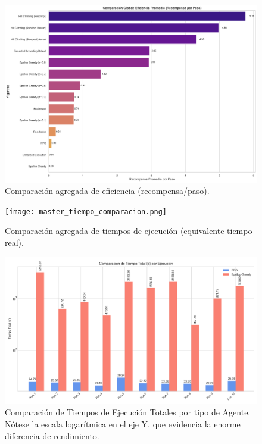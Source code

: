 \documentclass[12pt, oneside, openany]{book}
\begin{document}
\begin{figure}[H]
    \centering
    \includegraphics[width=1\textwidth]{master_eficiencia_comparacion.png}
    \caption{Comparación agregada de eficiencia (recompensa/paso).}
    \label{fig:master_eficiencia}
\end{figure}

\begin{figure}[H]
    \centering
    \texttt{[image: master\_tiempo\_comparacion.png]}
    \caption{Comparación agregada de tiempos de ejecución (equivalente tiempo real).}
    \label{fig:master_tiempo}
\end{figure}

\begin{figure}[H]
    \centering
    \includegraphics[width=1\textwidth]{tiempo_comparacion.png}
    \caption{Comparación de Tiempos de Ejecución Totales por tipo de Agente. Nótese la escala logarítmica en el eje Y, que evidencia la enorme diferencia de rendimiento.}
    \label{fig:tiempo_comparacion_general}
\end{figure}
\end{document}
